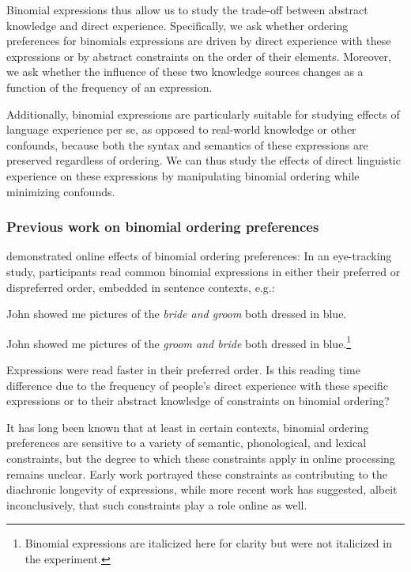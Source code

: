 \documentclass[authoryear]{elsarticle}
\begin{document}
Binomial expressions thus allow us to study the trade-off between abstract knowledge and direct experience. Specifically, we ask whether ordering preferences for binomials expressions are driven by direct experience with these expressions or by abstract constraints on the order of their elements. Moreover, we ask whether the influence of these two knowledge sources changes as a function of the frequency of an expression.

Additionally, binomial expressions are particularly suitable for studying effects of language experience per se, as opposed to real-world knowledge or other confounds, because both the syntax and semantics of these expressions are preserved regardless of ordering. We can thus study the effects of direct linguistic experience on these expressions by manipulating binomial ordering while minimizing confounds.

\subsubsection{Previous work on binomial ordering preferences}

\citet{SiyanovaChanturia:2011ep} demonstrated online effects of binomial ordering preferences: In an eye-tracking study, participants read common binomial expressions in either their preferred or dispreferred order, embedded in sentence contexts, e.g.:
\begin{exe}
\item John showed me pictures of the \emph{bride and groom} both dressed in blue.
\item John showed me pictures of the \emph{groom and bride} both dressed in blue.\footnote{Binomial expressions are italicized here for clarity but were not italicized in the experiment.}
\end{exe}
Expressions were read faster in their preferred order. Is this reading time difference due to the frequency of people's direct experience with these specific expressions or to their abstract knowledge of constraints on binomial ordering?

It has long been known that at least in certain contexts, binomial ordering preferences are sensitive to a variety of semantic, phonological, and lexical constraints, but the degree to which these constraints apply in online processing remains unclear. Early work portrayed these constraints as contributing to the diachronic longevity of expressions, while more recent work has suggested, albeit inconclusively, that such constraints play a role online as well.
 	
\end{document}
